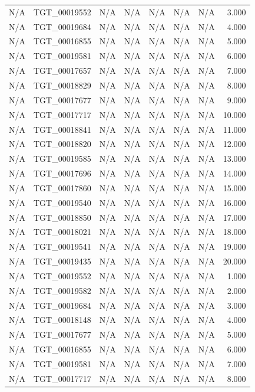 \begin{table}[h!]
\begin{tabular}{lrrrrrrr}
N/A & TGT\_00019552 & N/A & N/A & N/A & N/A & N/A & 3.000 \\
N/A & TGT\_00019684 & N/A & N/A & N/A & N/A & N/A & 4.000 \\
N/A & TGT\_00016855 & N/A & N/A & N/A & N/A & N/A & 5.000 \\
N/A & TGT\_00019581 & N/A & N/A & N/A & N/A & N/A & 6.000 \\
N/A & TGT\_00017657 & N/A & N/A & N/A & N/A & N/A & 7.000 \\
N/A & TGT\_00018829 & N/A & N/A & N/A & N/A & N/A & 8.000 \\
N/A & TGT\_00017677 & N/A & N/A & N/A & N/A & N/A & 9.000 \\
N/A & TGT\_00017717 & N/A & N/A & N/A & N/A & N/A & 10.000 \\
N/A & TGT\_00018841 & N/A & N/A & N/A & N/A & N/A & 11.000 \\
N/A & TGT\_00018820 & N/A & N/A & N/A & N/A & N/A & 12.000 \\
N/A & TGT\_00019585 & N/A & N/A & N/A & N/A & N/A & 13.000 \\
N/A & TGT\_00017696 & N/A & N/A & N/A & N/A & N/A & 14.000 \\
N/A & TGT\_00017860 & N/A & N/A & N/A & N/A & N/A & 15.000 \\
N/A & TGT\_00019540 & N/A & N/A & N/A & N/A & N/A & 16.000 \\
N/A & TGT\_00018850 & N/A & N/A & N/A & N/A & N/A & 17.000 \\
N/A & TGT\_00018021 & N/A & N/A & N/A & N/A & N/A & 18.000 \\
N/A & TGT\_00019541 & N/A & N/A & N/A & N/A & N/A & 19.000 \\
N/A & TGT\_00019435 & N/A & N/A & N/A & N/A & N/A & 20.000 \\
N/A & TGT\_00019552 & N/A & N/A & N/A & N/A & N/A & 1.000 \\
N/A & TGT\_00019582 & N/A & N/A & N/A & N/A & N/A & 2.000 \\
N/A & TGT\_00019684 & N/A & N/A & N/A & N/A & N/A & 3.000 \\
N/A & TGT\_00018148 & N/A & N/A & N/A & N/A & N/A & 4.000 \\
N/A & TGT\_00017677 & N/A & N/A & N/A & N/A & N/A & 5.000 \\
N/A & TGT\_00016855 & N/A & N/A & N/A & N/A & N/A & 6.000 \\
N/A & TGT\_00019581 & N/A & N/A & N/A & N/A & N/A & 7.000 \\
N/A & TGT\_00017717 & N/A & N/A & N/A & N/A & N/A & 8.000 \\

\end{tabular}
\end{table}
